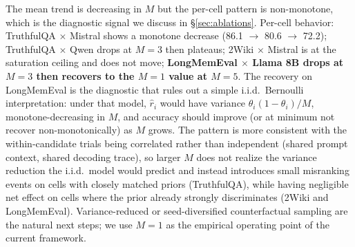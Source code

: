 \documentclass{article}
\begin{document}
The mean trend is decreasing in $M$ but the per-cell pattern is non-monotone, which is the diagnostic signal we discuss in §\ref{sec:ablations}. Per-cell behavior: TruthfulQA $\times$ Mistral shows a monotone decrease (86.1 $\to$ 80.6 $\to$ 72.2); TruthfulQA $\times$ Qwen drops at $M{=}3$ then plateaus; 2Wiki $\times$ Mistral is at the saturation ceiling and does not move; \textbf{LongMemEval $\times$ Llama 8B drops at $M{=}3$ then recovers to the $M{=}1$ value at $M{=}5$}. The recovery on LongMemEval is the diagnostic that rules out a simple i.i.d.\ Bernoulli interpretation: under that model, $\hat{r}_i$ would have variance $\theta_i(1-\theta_i)/M$, monotone-decreasing in $M$, and accuracy should improve (or at minimum not recover non-monotonically) as $M$ grows. The pattern is more consistent with the within-candidate trials being correlated rather than independent (shared prompt context, shared decoding trace), so larger $M$ does not realize the variance reduction the i.i.d.\ model would predict and instead introduces small misranking events on cells with closely matched priors (TruthfulQA), while having negligible net effect on cells where the prior already strongly discriminates (2Wiki and LongMemEval). Variance-reduced or seed-diversified counterfactual sampling are the natural next steps; we use $M{=}1$ as the empirical operating point of the current framework.
\end{document}
